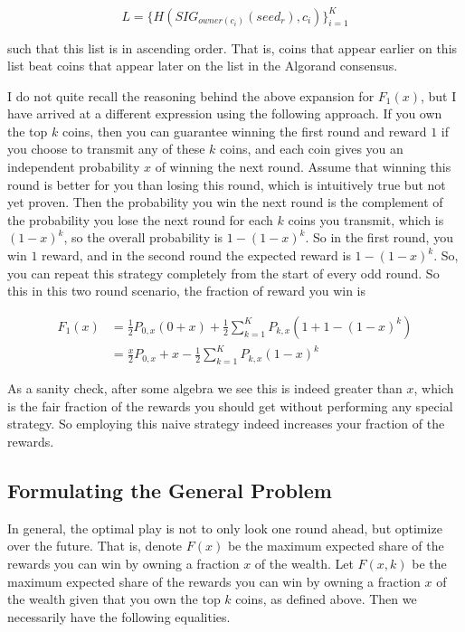 \documentclass[11pt, oneside]{article}   	%
\begin{document}
$$
L = \{H(SIG_{owner(c_i)}(seed_r), c_i)\}_{i=1}^K
$$

such that this list is in ascending order. That is, coins that appear earlier on this list beat coins that appear later on the list in the Algorand consensus.

I do not quite recall the reasoning behind the above expansion for $F_1(x)$, but I have arrived at a different expression using the following approach. If you own the top $k$ coins, then you can guarantee winning the first round and reward $1$ if you choose to transmit any of these $k$ coins, and each coin gives you an independent probability $x$ of winning the next round. Assume that winning this round is better for you than losing this round, which is intuitively true but not yet proven. Then the probability you win the next round is the complement of the probability you lose the next round for each $k$ coins you transmit, which is $(1-x)^k$, so the overall probability is $1-(1-x)^k$. So in the first round, you win $1$ reward, and in the second round the expected reward is $1-(1-x)^k$. So, you can repeat this strategy completely from the start of every odd round. So this in this two round scenario, the fraction of reward you win is

\begin{align*}
F_1(x) &= \frac12P_{0, x}(0 + x) + \frac12\sum_{k=1}^{K} P_{k, x} \left(1+1-(1-x)^k \right) \\
& = \frac{x}2P_{0,x} +  x -  \frac12\sum_{k=1}^{K} P_{k, x} (1-x)^k 
\end{align*}

As a sanity check, after some algebra we see this is indeed greater than $x$, which is the fair fraction of the rewards you should get without performing any special strategy. So employing this naive strategy indeed increases your fraction of the rewards.

\subsection{Formulating the General Problem}
In general, the optimal play is not to only look one round ahead, but optimize over the future. That is, denote $F(x)$ be the maximum expected share of the rewards you can win by owning a fraction $x$ of the wealth. Let $F(x, k)$ be the maximum expected share of the rewards you can win by owning a fraction $x$ of the wealth given that you own the top $k$ coins, as defined above. Then we necessarily have the following equalities.
\end{document}
